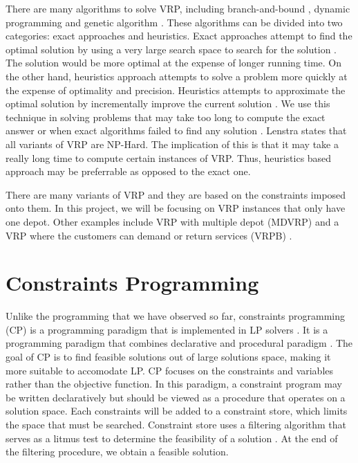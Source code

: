 There are many algorithms to solve VRP, including branch-and-bound \cite{Dastghaibifard2008, LPVanderbei}, dynamic programming \cite{Kok2009} and genetic algorithm \cite{Masum2011}.
These algorithms can be divided into two categories: exact approaches and heuristics. Exact approaches attempt
to find the optimal solution by using a very large search space to search for the solution \cite{neo:exact}. The solution would be more optimal at the expense
 of longer running time. On the other hand, heuristics approach
 attempts to solve a problem more quickly at the expense of optimality and precision. Heuristics attempts to approximate the optimal solution by incrementally improve
 the current solution \cite{Laporte1999}. We use this technique in solving problems that may take too long to compute the exact answer or when exact algorithms failed to find any solution \cite{neo:exact}.
 Lenstra \cite{Lenstra1981} states that all variants of VRP are NP-Hard. The implication of this is that it may
take a really long time to compute certain instances of VRP. Thus, heuristics based approach may be preferrable as opposed to
the exact one.

There are many variants of VRP and they are based
 on the constraints imposed onto them. In this project, we will be focusing on VRP instances that only have one depot.
  Other examples include VRP with multiple depot (MDVRP) \cite{Daneshzand2011} and a VRP where the
 customers can demand or return services (VRPB) \cite{Daneshzand2011}.

\section{Constraints Programming}
Unlike the programming that we have observed so far, constraints programming (CP) is a programming paradigm that is implemented
in LP solvers \cite{wiki:cp}. It is a programming paradigm that combines declarative and procedural paradigm \cite{wiki:cp, Bockmayr2003}.
The goal of CP is to find feasible solutions out of large solutions space, making it
more suitable to accomodate LP. CP focuses on the constraints and variables rather than the objective function.
In this paradigm, a constraint program may be written declaratively but should be viewed as a procedure that operates on a
solution space. Each constraints will be added to a constraint store, which limits the space that must be searched.
Constraint store uses a filtering algorithm that serves as a litmus test to determine the feasibility of a solution \cite{Bockmayr2003}.
At the end of the filtering procedure, we obtain a feasible solution.

